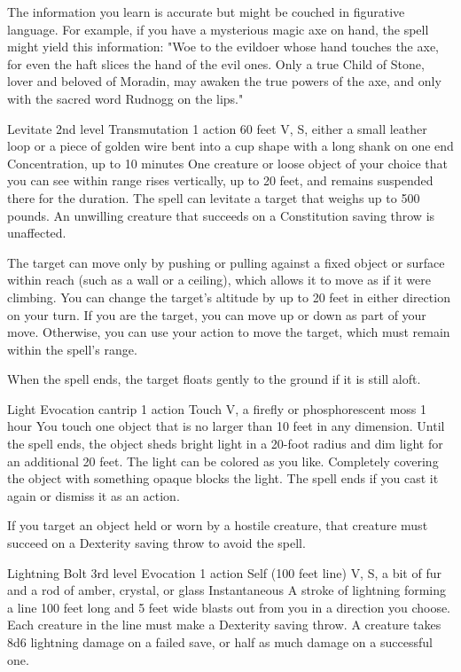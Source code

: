 \documentclass[10pt,a4paper,twoside,bg=print,twocolumn,openany,nodeprecatedcode]{dndbook}
\begin{document}
The information you learn is accurate but might be couched in figurative language. For example, if you have a mysterious magic axe on hand, the spell might yield this information: "Woe to the evildoer whose hand touches the axe, for even the haft slices the hand of the evil ones. Only a true Child of Stone, lover and beloved of Moradin, may awaken the true powers of the axe, and only with the sacred word Rudnogg on the lips."



\DndSpellHeader%
{Levitate}
{2nd level Transmutation}
{1 action}
{60 feet}
{V, S, either a small leather loop or a piece of golden wire bent into a cup shape with a long shank on one end}
{Concentration, up to 10 minutes}
One creature or loose object of your choice that you can see within range rises vertically, up to 20 feet, and remains suspended there for the duration. The spell can levitate a target that weighs up to 500 pounds. An unwilling creature that succeeds on a Constitution saving throw is unaffected.

The target can move only by pushing or pulling against a fixed object or surface within reach (such as a wall or a ceiling), which allows it to move as if it were climbing. You can change the target's altitude by up to 20 feet in either direction on your turn. If you are the target, you can move up or down as part of your move. Otherwise, you can use your action to move the target, which must remain within the spell's range.

When the spell ends, the target floats gently to the ground if it is still aloft.



\DndSpellHeader%
{Light}
{Evocation cantrip}
{1 action}
{Touch}
{V, a firefly or phosphorescent moss}
{1 hour}
You touch one object that is no larger than 10 feet in any dimension. Until the spell ends, the object sheds bright light in a 20-foot radius and dim light for an additional 20 feet. The light can be colored as you like. Completely covering the object with something opaque blocks the light. The spell ends if you cast it again or dismiss it as an action.

If you target an object held or worn by a hostile creature, that creature must succeed on a Dexterity saving throw to avoid the spell.



\DndSpellHeader%
{Lightning Bolt}
{3rd level Evocation}
{1 action}
{Self (100 feet line)}
{V, S, a bit of fur and a rod of amber, crystal, or glass}
{Instantaneous}
A stroke of lightning forming a line 100 feet long and 5 feet wide blasts out from you in a direction you choose. Each creature in the line must make a Dexterity saving throw. A creature takes 8d6 lightning damage on a failed save, or half as much damage on a successful one.
\end{document}
